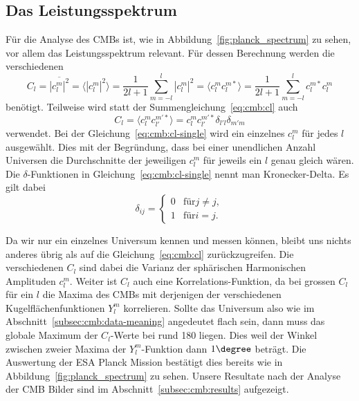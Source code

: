 \subsection{Das Leistungsspektrum}

Für die Analyse des CMBs ist, wie in Abbildung~\ref{fig:planck_spectrum} zu 
sehen, vor allem das Leistungsspektrum relevant. Für dessen Berechnung werden 
die verschiedenen
\begin{equation}
	C_l = \overline{|c_l^m|^2} = \langle |c_l^m|^2 \rangle =  \frac{1}{2l + 
	1}\sum_{m=-l}^{l}|c_l^m|^2 = \langle c_l^m 
	c_l^{m*} \rangle = 
	\frac{1}{2l + 
	1}\sum_{m=-l}^{l}c_l^{m*}c_l^m
	\label{eq:cmb:cl}
\end{equation}
benötigt. Teilweise wird statt der Summengleichung~\ref{eq:cmb:cl} auch
\begin{equation*}
	C_l = \langle c_{l}^{m}c_{l'}^{m'*} \rangle = 
	c_{l}^{m}c_{l'}^{m'*}\delta_{l'l}\delta_{m'm}
	\label{eq:cmb:cl-single}
\end{equation*}
verwendet. Bei der Gleichung~\ref{eq:cmb:cl-single} wird ein einzelnes 
$c_l^m$ für jedes $l$ ausgewählt. Dies mit der Begründung, dass bei einer 
unendlichen Anzahl Universen die Durchschnitte der jeweiligen $c_l^m$ für 
jeweils ein $l$ genau gleich wären. \cite{cmb_klauber} Die $\delta$-Funktionen 
in Gleichung~\ref{eq:cmb:cl-single} nennt man Kronecker-Delta. Es gilt dabei
\begin{equation}
	\delta_{ij} =
	\begin{cases}
		0 & \text{für} j \neq j, \\
		1 & \text{für} i = j.
	\end{cases}
\end{equation}

Da wir nur ein einzelnes Universum kennen und messen können, bleibt uns 
nichts anderes übrig als auf die Gleichung~\ref{eq:cmb:cl} zurückzugreifen. Die 
verschiedenen $C_l$ sind dabei die Varianz der sphärischen Harmonischen 
Amplituden $c_l^m$. Weiter ist $C_l$ auch eine Korrelations-Funktion, da bei 
grossen $C_l$ für ein $l$ die Maxima des CMBs mit derjenigen der verschiedenen 
Kugelflächenfunktionen $Y_l^m$ korrelieren. Sollte das Universum also wie im 
Abschnitt~\ref{subsec:cmb:data-meaning} angedeutet flach sein, dann muss das 
globale Maximum der $C_l$-Werte bei rund 180 liegen. Dies weil der Winkel 
zwischen zweier Maxima der $Y_l^m$-Funktion dann $1\degree$ beträgt. Die 
Auswertung der ESA Planck Mission bestätigt dies bereits wie in 
Abbildung~\ref{fig:planck_spectrum} zu sehen. Unsere Resultate nach der Analyse 
der CMB Bilder sind im Abschnitt~\ref{subsec:cmb:results} aufgezeigt.



